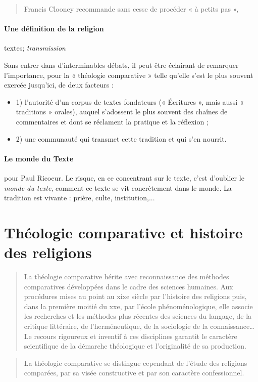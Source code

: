 \begin{quote}
        Francis Clooney recommande sans cesse de procéder « à petits pas »,
\end{quote}

\paragraph{Une définition de la religion} textes; \textit{transmission}
\begin{Def}
        Sans entrer dans d’interminables débats, il peut être éclairant de remarquer l’importance, pour la « théologie comparative » telle qu’elle s’est le plus souvent exercée jusqu’ici, de deux facteurs : \begin{itemize}
            \item 1) l’autorité d’un corpus de textes fondateurs (« Écritures », mais aussi « traditions » orales), auquel s’adossent le plus souvent des chaînes de commentaires et dont se réclament la pratique et la réflexion ;
            \item 2) une communauté qui transmet cette tradition et qui s’en nourrit.
        \end{itemize} 
\end{Def}


\paragraph{Le monde du Texte} pour Paul Ricoeur. Le risque, en ce concentrant sur le texte, c'est d'oublier le \textit{monde du texte}, comment ce texte se vit concrètement dans le monde. La tradition est vivante : prière, culte, institution,...

 \section{Théologie comparative et histoire des religions}
  \begin{quote}
 La théologie comparative hérite avec reconnaissance des méthodes comparatives développées dans le cadre des sciences humaines. Aux procédures mises au point au xixe siècle par l’histoire des religions puis, dans la première moitié du xxe, par l’école phénoménologique, elle associe les recherches et les méthodes plus récentes des sciences du langage, de la critique littéraire, de l’herméneutique, de la sociologie de la connaissance… Le recours rigoureux et inventif à ces disciplines garantit le caractère scientifique de la démarche théologique et l’originalité de sa production.
\end{quote}
 \begin{quote}
        La théologie comparative se distingue cependant de l’étude des religions comparées, par sa visée constructive et par son caractère confessionnel.
\end{quote}



